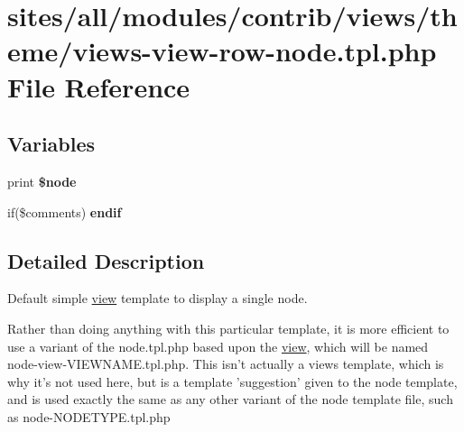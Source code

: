 \hypertarget{views-view-row-node_8tpl_8php}{
\section{sites/all/modules/contrib/views/theme/views-view-row-node.tpl.php File Reference}
\label{views-view-row-node_8tpl_8php}
}
\subsection*{Variables}
\begin{CompactItemize}
\item 
\hypertarget{views-view-row-node_8tpl_8php_2b55f72c6da822668fde924c6af14b49}{
print \textbf{\$node}}
\label{views-view-row-node_8tpl_8php_2b55f72c6da822668fde924c6af14b49}

\item 
\hypertarget{views-view-row-node_8tpl_8php_e02fef85483c0eb837f4d4d00b9f0543}{
if(\$comments) \textbf{endif}}
\label{views-view-row-node_8tpl_8php_e02fef85483c0eb837f4d4d00b9f0543}

\end{CompactItemize}


\subsection{Detailed Description}
Default simple \hyperlink{classview}{view} template to display a single node.

Rather than doing anything with this particular template, it is more efficient to use a variant of the node.tpl.php based upon the \hyperlink{classview}{view}, which will be named node-view-VIEWNAME.tpl.php. This isn't actually a views template, which is why it's not used here, but is a template 'suggestion' given to the node template, and is used exactly the same as any other variant of the node template file, such as node-NODETYPE.tpl.php 
